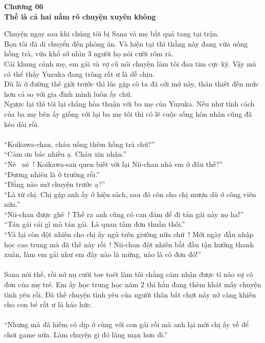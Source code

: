 \documentclass[12pt,a4paper, twosides]{book}
\begin{document}
    \begin{center}
    \textbf{\large Chương 06 \\ Thế là cả hai nắm rõ chuyện xuyên không}
    \end{center}
    \noindent
Chuyện ngay sau khi chúng tôi bị Sana và mẹ bắt quả tang tại trận.\\
Bọn tôi đã di chuyển đến phòng ăn. Và hiện tại thì thằng này đang vừa uống hồng trà, vừa khổ sở nhìn 3 người họ nói cười rôm rả.\\
Cái khung cảnh mẹ, em gái và vợ cũ nói chuyện làm tôi đau tim cực kỳ. Vậy mà có thể thấy Yuzuka đang trông rất ư là dễ chịu.\\
Dù là ở đường thế giới trước thì lúc gặp cô ta đã cởi mở này, thân thiết đến mức hơn cả so với gia đình mình luôn ấy chứ.\\
Ngược lại thì tôi lại chẳng hòa thuận với ba mẹ của Yuzuka. Nếu như tính cách của ba mẹ bên ấy giống với lại ba mẹ tôi thì có lẽ cuộc sống hôn nhân cũng đã kéo dài rồi.\\
\\
“Koikawa-chan, cháu uống thêm hồng trà chứ?”\\
“Cảm ơn bác nhiều ạ. Cháu xin nhận.”\\
“Nè~ nè~! Koikawa-san quen biết với lại Nii-chan nhà em ở đâu thế?”\\
“Đương nhiên là ở trường rồi.”\\
“Đằng nào mở chuyện trước ạ?”\\
“Là từ chị. Chị gặp anh ấy ở hiệu sách, sau đó còn cho chị mượn dù ở công viên nữa.”\\
“Nii-chan được ghê~! Thế ra anh cũng có can đảm để đi tán gái này nọ ha!”\\
“Tán gái cái gì mà tán gái. Là quan tâm đơn thuần thôi.”\\
“Vả lại còn đột nhiên cho chị ấy ngủ trên giường nữa chứ~! Mới ngày đầu nhập học cao trung mà đã thế này rồi~! Nii-chan đột nhiên bắt đầu tận hưởng thanh xuân, làm em gái như em đây nào là mừng, nào là cô đơn đó!”\\
\\
Sana nói thế, rồi nở nụ cười toe toét làm tôi chẳng cảm nhận được tí nào sự cô đơn của mẹ trẻ. Em ấy học trung học năm 2 thì hẳn đang thèm khát mấy chuyện tình yêu rồi. Đã thế chuyện tình yêu của người thân bất chợt nảy nở càng khiến cho con bé rất ư là háo hức.\\
\\
“Nhưng mà đã hiếm có dịp ở cùng với con gái rồi mà anh lại mời chị ấy về để chơi game nữa. Làm chuyện gì đó lãng mạn hơn đi.”\\
\end{document}
